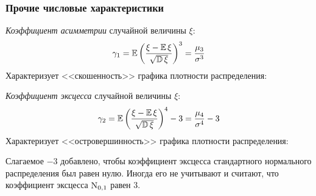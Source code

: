 \subsubsection{Прочие числовые характеристики}

\begin{defn}
    \textit{Коэффициент асимметрии} случайной величины $\xi$:
    \begin{equation*}
        \gamma_1=\operatorname{\mathbb{E}} \left(\frac{\xi - \operatorname{\mathbb{E}} \xi}{\sqrt{\operatorname{\mathbb{D}}\xi}}\right)^3 = \frac{\mu_3}{\sigma^3}
    \end{equation*}
    Характеризует <<скошенность>> графика плотности распределения: \medskip\hfill\break
    
\end{defn}

\begin{defn}
    \textit{Коэффициент эксцесса} случайной величины $\xi$:
    \begin{equation*}
        \gamma_2=\operatorname{\mathbb{E}} \left(\frac{\xi - \operatorname{\mathbb{E}} \xi}{\sqrt{\operatorname{\mathbb{D}}\xi}}\right)^4 - 3 = \frac{\mu_4}{\sigma^4} - 3
    \end{equation*}
    Характеризует <<островершинность>> графика плотности распределения:
    \medskip\hfill\break
    
\end{defn}

\begin{rmrk}
    Слагаемое $-3$ добавлено, чтобы коэффициент эксцесса стандартного нормального распределения был равен нулю. Иногда его не учитывают и считают, что коэффициент эксцесса $\operatorname{\mathrm{N}}_{0,1}$ равен 3.
\end{rmrk}

